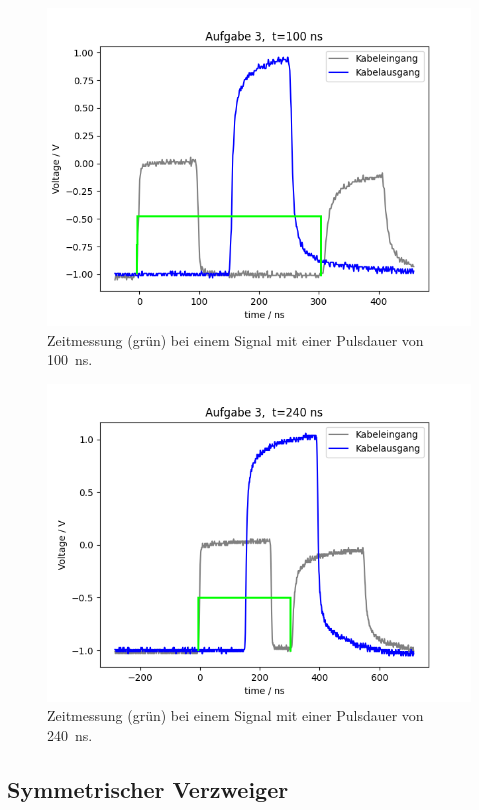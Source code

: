 \documentclass{article}
\begin{document}
\begin{figure}[H]
\centering
\caption{Zeitmessung (grün) bei einem Signal mit einer Pulsdauer von 100~ns.}
\label{fig:task3_100ns}
\includegraphics[scale=0.6]{bilder/task3/task3_100ns.png}
\end{figure}

\begin{figure}[H]
\centering
\caption{Zeitmessung (grün) bei einem Signal mit einer Pulsdauer von 240~ns.}
\label{fig:task3_240ns}
\includegraphics[scale=0.6]{bilder/task3/task3_240ns.png}
\end{figure}


\subsection{Symmetrischer Verzweiger}
\end{document}
